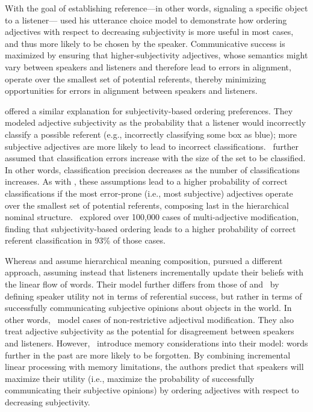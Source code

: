 \documentclass[12pt,letterpaper]{article}
\begin{document}
With the goal of establishing reference---in other words, signaling a specific object to a listener---\citeauthor{simonic2018} used his utterance choice model to demonstrate how ordering adjectives with respect to decreasing subjectivity is more useful in most cases, and thus more likely to be chosen by the speaker. Communicative success is maximized by ensuring that higher-subjectivity adjectives, whose semantics might vary between speakers and listeners and therefore lead to errors in alignment, operate over the smallest set of potential referents, thereby minimizing opportunities for errors in alignment between speakers and listeners.

\cite{scontrasetalSPadjectives} offered a similar explanation for subjectivity-based ordering preferences. They modeled adjective subjectivity as the probability that a listener would incorrectly classify a possible referent (e.g., incorrectly classifying some box as blue); more subjective adjectives are more likely to lead to incorrect classifications. \citeauthor{scontrasetalSPadjectives}~further assumed that classification errors increase with the size of the set to be classified. In other words, classification precision decreases as the number of classifications increases. As with \citeauthor{simonic2018}, these assumptions lead to a higher probability of correct classifications if the most error-prone (i.e., most subjective) adjectives operate over the smallest set of potential referents, composing last in the hierarchical nominal structure. \citeauthor{scontrasetalSPadjectives}~explored over 100,000 cases of multi-adjective modification, finding that subjectivity-based ordering leads to a higher probability of correct referent classification in 93\% of those cases.

Whereas \cite{simonic2018} and \cite{scontrasetalSPadjectives} assume hierarchical meaning composition, \cite{hahnetal2018} pursued a different approach, assuming instead that listeners incrementally update their beliefs with the linear flow of words. Their model further differs from those of \citeauthor{simonic2018} and \citeauthor{scontrasetalSPadjectives}~by defining speaker utility not in terms of referential success, but rather in terms of successfully communicating subjective opinions about objects in the world. In other words, \citeauthor{hahnetal2018}~model cases of non-restrictive adjectival modification. They also treat adjective subjectivity as the potential for disagreement between speakers and listeners. However, \citeauthor{hahnetal2018}~introduce memory considerations into their model: words further in the past are more likely to be forgotten. By combining incremental linear processing with memory limitations, the authors predict that speakers will maximize their utility (i.e., maximize the probability of successfully communicating their subjective opinions) by ordering adjectives with respect to decreasing subjectivity.
\end{document}
